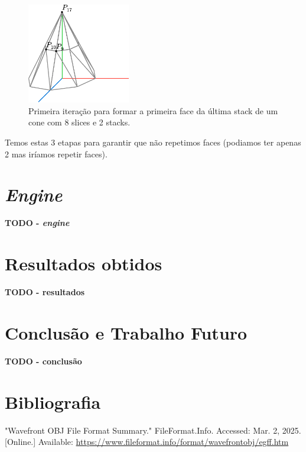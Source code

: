 \documentclass[12pt, a4paper]{article}
\begin{document}
\begin{figure}[H]
    \centering
    \includegraphics[width=0.4\textwidth]{res/figures/Cone5.pdf}
    \caption{
        Primeira iteração para formar a primeira face da última stack de um cone com 8 slices
        e 2 stacks.
    }
\end{figure}

Temos estas 3 etapas para garantir que não repetimos faces (podiamos ter apenas 2 mas iríamos
repetir faces).

\section{\emph{Engine}}

\textbf{\color{red} TODO - \emph{engine}}

\section{Resultados obtidos}

\textbf{\color{red} TODO - resultados}

\section{Conclusão e Trabalho Futuro}

\textbf{\color{red} TODO - conclusão}

\begingroup
\section{Bibliografia}
\renewcommand{\section}[2]{}

\begin{thebibliography}{9}
        "Wavefront OBJ File Format Summary."{} FileFormat.Info. Accessed: Mar. 2, 2025. [Online.]
        Available: \url{https://www.fileformat.info/format/wavefrontobj/egff.htm}
\end{thebibliography}
\endgroup
\end{document}
